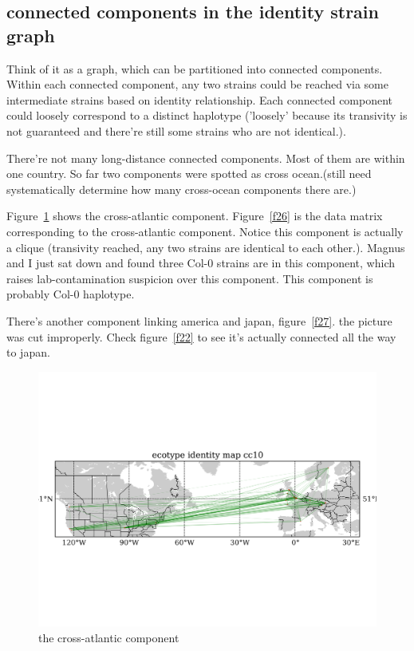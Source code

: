 \documentclass[a4paper,10pt]{article}
\begin{document}
\subsection{connected components in the identity strain graph}
Think of it as a graph, which can be partitioned into connected components. Within each connected component, any two strains could be reached via some intermediate strains based on identity relationship. Each connected component could loosely correspond to a distinct haplotype ('loosely' because its transivity is not guaranteed and there're still some strains who are not identical.).

There're not many long-distance connected components. Most of them are within one country. So far two components were spotted as cross ocean.(still need systematically determine how many cross-ocean components there are.)

Figure~\ref{f25} shows the cross-atlantic component. Figure~\ref{f26} is the data matrix corresponding to the cross-atlantic component. Notice this component is actually a clique (transivity reached, any two strains are identical to each other.). Magnus and I just sat down and found three Col-0 strains are in this component, which raises lab-contamination suspicion over this component. This component is probably Col-0 haplotype.

There's another component linking america and japan, figure~\ref{f27}. the picture was cut improperly. Check figure~\ref{f22} to see it's actually connected all the way to japan.

\begin{figure}
\includegraphics[width=1\textwidth]{figures/ecotype_identity_cc10_site_network.png}
\caption{the cross-atlantic component}\label{f25}
\end{figure}
\end{document}
